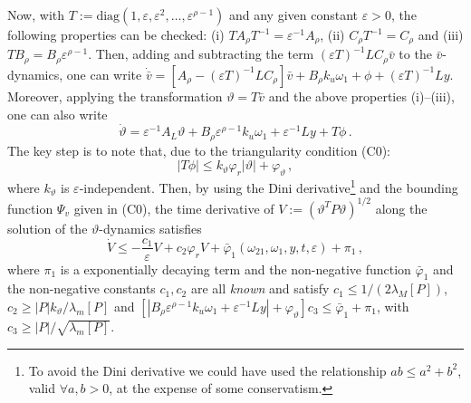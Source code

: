 \documentclass{rncauth}
\begin{document}
Now, with
$T:=\mbox{diag}(1,\varepsilon,\varepsilon^2,\ldots,\varepsilon^{\rho-1})$
and any given constant $\varepsilon\!>\!0$, the following
properties can be checked: (i) $T A_\rho T^{-1}=\varepsilon^{-1}
A_\rho$, (ii) $C_\rho T^{-1}=C_\rho$ and (iii) $T B_\rho=B_\rho
\varepsilon^{\rho-1}$. Then, adding and subtracting the term
$(\varepsilon T)^{-1}LC_\rho \bar{v}$ to the $\bar{v}$-dynamics,
one can write $\dot{\bar{v}}=[A_\rho-(\varepsilon T)^{-1}LC_\rho]
\bar{v}+ B_\rho k_u \omega_1+\phi+(\varepsilon T)^{-1}Ly$.
Moreover, applying the transformation $\vartheta=T \bar{v}$ and
the above properties (i)--(iii), one can also write
%
$$\dot{\vartheta}=\varepsilon^{-1} A_L \vartheta + B_\rho \varepsilon^{\rho-1}
k_u \omega_1+\varepsilon^{-1}Ly+T \phi\,.$$
%
The key step is to note that, due to the triangularity condition
(C0):
%
$$|T\phi| \leq k_\vartheta \varphi_r |\vartheta| +
\varphi_\vartheta\,,$$
%
where $k_\vartheta$ is $\varepsilon$-independent. Then, by using
the Dini derivative\footnote{To avoid the Dini
derivative we could
have used the relationship $ab\leq a^2+b^2$, valid $\forall a,b
>0$,
at the expense of some conservatism.} and the bounding function
$\Psi_v$ given in (C0), the time derivative of $V:=(\vartheta^T P
\vartheta)^{1/2}$ along the solution of the $\vartheta$-dynamics
satisfies
%
$$\dot{V} \leq -\frac{c_1}{\varepsilon} V +c_2 \varphi_r
V+\bar{\varphi}_1(\omega_{21},\omega_1,y,t,\varepsilon)+\pi_1\,,$$
%
where $\pi_1$ is a exponentially decaying term and the
non-negative function $\bar{\varphi}_1$ and the non-negative
constants $c_1,c_2$ are all {\em known} and satisfy $c_1\leq
1/(2\lambda_M[P])$, $c_2 \geq |P|k_\vartheta /\lambda_m[P]$ and
$[|B_\rho \varepsilon^{\rho-1} k_u
\omega_1+\varepsilon^{-1}Ly|+\varphi_\vartheta]c_3\leq
\bar{\varphi}_1+\pi_1$, with $c_3\geq|P|/\sqrt{\lambda_m[P]}$.
\end{document}
